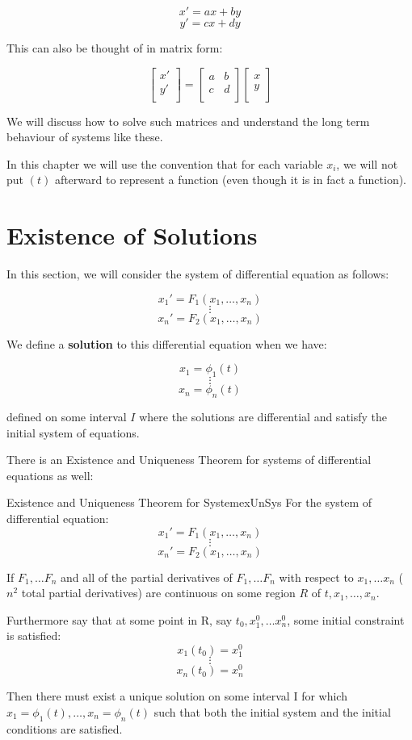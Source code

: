 \documentclass{report}
\begin{document}
$$x' = ax + by$$
$$y' = cx + dy$$

This can also be thought of in matrix form:

$$
\begin{bmatrix}
    x' \\
    y' \\
\end{bmatrix}
=
\begin{bmatrix}
    a & b \\
    c & d \\
\end{bmatrix}
\begin{bmatrix}
    x \\
    y \\
\end{bmatrix}
$$

We will discuss how to solve such matrices and understand the long term behaviour of systems like these.

In this chapter we will use the convention that for each variable $x_i$, we will not put $(t)$ afterward to represent a function (even though it is in fact a function).

\section{Existence of Solutions}
In this section, we will consider the system of differential equation as follows:

$$x_1' = F_1(x_1, \dots, x_n)$$
$$\vdots$$
$$x_n' = F_2(x_1, \dots, x_n)$$

We define a \textbf{solution} to this differential equation when we have:

$$x_1 = \phi_1(t)$$
$$\vdots$$
$$x_n = \phi_n(t)$$

defined on some interval $I$ where the solutions are differential and satisfy the initial system of equations.

There is an Existence and Uniqueness Theorem for systems of differential equations as well:

\begin{mytheo}{Existence and Uniqueness Theorem for System}{exUnSys}
    For the system of differential equation:
    $$x_1' = F_1(x_1, \dots, x_n)$$
    $$\vdots$$
    $$x_n' = F_2(x_1, \dots, x_n)$$
    
    If $F_1, \dots F_n$  and all of the partial derivatives of $F_1, \dots F_n$ with respect to $x_1, \dots x_n$ ($n^2$ total partial derivatives) are continuous on some region $R$ of $t, x_1, \dots, x_n$. 
    
    Furthermore say that at some point in R, say
    $t_0, x_1^0, \dots x_n^0$, some initial constraint is satisfied:
    $$x_1(t_0) = x_1^0$$
    $$\vdots$$
    $$x_n(t_0) = x_n^0$$
    
    Then there must exist a unique solution on some interval I for which $x_1 = \phi_1(t), \dots, x_n = \phi_n(t)$ such that both the initial system and the initial conditions are satisfied.
    
\end{mytheo}
\end{document}
